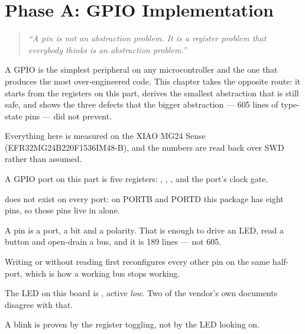 
\chapter{Phase A: GPIO Implementation}
\label{ch:chapter-04}

\begin{quote}
    \textit{``A pin is not an abstraction problem. It is a register problem that everybody thinks is
    an abstraction problem.''}
\end{quote}

A GPIO is the simplest peripheral on any microcontroller and the one that produces the most
over-engineered code. This chapter takes the opposite route: it starts from the registers on this
part, derives the smallest abstraction that is still safe, and shows the three defects that the
bigger abstraction — 605 lines of type-state pins — did not prevent.

Everything here is measured on the XIAO MG24 Sense (EFR32MG24B220F1536IM48-B), and the numbers are
read back over SWD rather than assumed.

\minitoc

\clearpage








\clearpage

\begin{keytakeaways}
    \item A GPIO port on this part is five registers: , ,
          ,  and the port's clock gate.
    \item {} does not exist on every port: on PORTB and PORTD this package has eight
          pins, so those pins live in  alone.
    \item A pin is a port, a bit and a polarity. That is enough to drive an LED, read a button and
          open-drain a bus, and it is 189 lines — not 605.
    \item Writing  or  without reading first reconfigures every
          other pin on the same half-port, which is how a working bus stops working.
    \item The LED on this board is , active \emph{low}. Two of the vendor's own
          documents disagree with that.
    \item A blink is proven by the register toggling, not by the LED looking on.
\end{keytakeaways}
